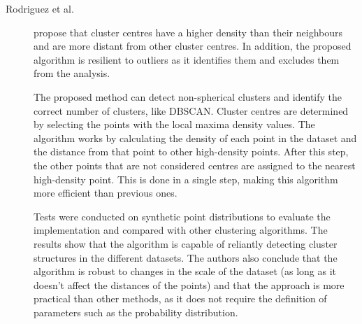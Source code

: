     


\begin{description}
    \item[Rodriguez et al.]\cite{Rodriguez.Laio_Clusteringfastsearch_2014} propose that cluster centres have a higher density than their neighbours and are more distant from other cluster centres. In addition, the proposed algorithm is resilient to outliers as it identifies them and excludes them from the analysis. 
    
    The proposed method can detect non-spherical clusters and identify the correct number of clusters, like DBSCAN. Cluster centres are determined by selecting the points with the local maxima density values. The algorithm works by calculating the density of each point in the dataset and the distance from that point to other high-density points. After this step, the other points that are not considered centres are assigned to the nearest high-density point. This is done in a single step, making this algorithm more efficient than previous ones. 

    Tests were conducted on synthetic point distributions to evaluate the implementation and compared with other clustering algorithms. The results show that the algorithm is capable of reliantly detecting cluster structures in the different datasets. The authors also conclude that the algorithm is robust to changes in the scale of the dataset (as long as it doesn't affect the distances of the points) and that the approach is more practical than other methods, as it does not require the definition of parameters such as the probability distribution.
\end{description}


